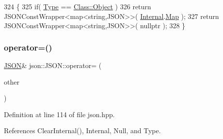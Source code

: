 \begin{DoxyCode}
324                                                                \{
325             \textcolor{keywordflow}{if}( \mbox{\hyperlink{classjson_1_1_j_s_o_n_a3fa6923afa41bdfe38077fbc0079aaf5}{Type}} == \mbox{\hyperlink{classjson_1_1_j_s_o_n_a762f55df6d407c1af61607ed516ffe07a497031794414a552435f90151ac3b54b}{Class::Object}} )
326                 \textcolor{keywordflow}{return} JSONConstWrapper<map<string,JSON>>( \mbox{\hyperlink{classjson_1_1_j_s_o_n_a1e2a064794c3d55c8bb8887fc5734947}{Internal}}.\mbox{\hyperlink{unionjson_1_1_j_s_o_n_1_1_backing_data_ab2e19b00745b37d2add157ff3a35c431}{Map}} );
327             \textcolor{keywordflow}{return} JSONConstWrapper<map<string,JSON>>( nullptr );
328         \}
\end{DoxyCode}
\mbox{\label{classjson_1_1_j_s_o_n_ab22885428262d4ed0a95c50d5537b13e}} 
\subsubsection{\texorpdfstring{operator=()}{operator=()}\hspace{0.1cm}{\footnotesize\ttfamily [1/6]}}
{\footnotesize\ttfamily \mbox{\hyperlink{classjson_1_1_j_s_o_n}{J\+S\+ON}}\& json\+::\+J\+S\+O\+N\+::operator= (\begin{DoxyParamCaption}\item[{\mbox{\hyperlink{classjson_1_1_j_s_o_n}{J\+S\+ON}} \&\&}]{other }\end{DoxyParamCaption})\hspace{0.3cm}{\ttfamily [inline]}}



Definition at line 114 of file json.\+hpp.



References Clear\+Internal(), Internal, Null, and Type.


